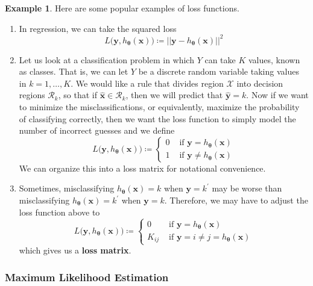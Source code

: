 \documentclass{article}
\theoremstyle{definition}
\newtheorem{example}{Example}[section]
\theoremstyle{remark}
\theoremstyle{definition}
\begin{document}
\begin{example}
Here are some popular examples of loss functions. 
\begin{enumerate}
    \item In regression, we can take the squared loss
    \[L\big( \mathbf{y}, h_{\boldsymbol{\theta}} (\mathbf{x}) \big) \coloneqq || \mathbf{y} - h_{\boldsymbol{\theta}} (\mathbf{x}) ||^2\] 

    \item Let us look at a classification problem in which $Y$ can take $K$ values, known as classes. That is, we can let $Y$ be a discrete random variable taking values in $k = 1, \ldots, K$. We would like a rule that divides region $\mathcal{X}$ into decision regions $\mathcal{R}_k$, so that if $\hat{\mathbf{x}} \in \mathcal{R}_k$, then we will predict that $\hat{\mathbf{y}} = k$. Now if we want to minimize the misclassifications, or equivalently, maximize the probability of classifying correctly, then we want the loss function to simply model the number of incorrect guesses and we define 
    \[L\big( \mathbf{y}, h_{\boldsymbol{\theta}} (\mathbf{x}) \big) \coloneqq \begin{cases} 0 & \text{ if } \mathbf{y} = h_{\boldsymbol{\theta}} (\mathbf{x}) \\ 1 & \text{ if } \mathbf{y} \neq h_{\boldsymbol{\theta}} (\mathbf{x}) \end{cases}\]
    We can organize this into a loss matrix for notational convenience.  

    \item Sometimes, misclassifying $h_{\boldsymbol{\theta}} (\mathbf{x}) = k$ when $\mathbf{y} = k^\prime$ may be worse than misclassifying $h_{\boldsymbol{\theta}} (\mathbf{x}) = k^\prime$ when $\mathbf{y} = k$. Therefore, we may have to adjust the loss function above to 
    \[L\big( \mathbf{y}, h_{\boldsymbol{\theta}} (\mathbf{x}) \big) \coloneqq \begin{cases} 0 & \text{ if } \mathbf{y} = h_{\boldsymbol{\theta}} (\mathbf{x}) \\ K_{ij} & \text{ if } \mathbf{y} = i \neq j = h_{\boldsymbol{\theta}} (\mathbf{x})\end{cases}\]
    which gives us a \textbf{loss matrix}. 
\end{enumerate}
\end{example}

\subsubsection{Maximum Likelihood Estimation}
\end{document}
